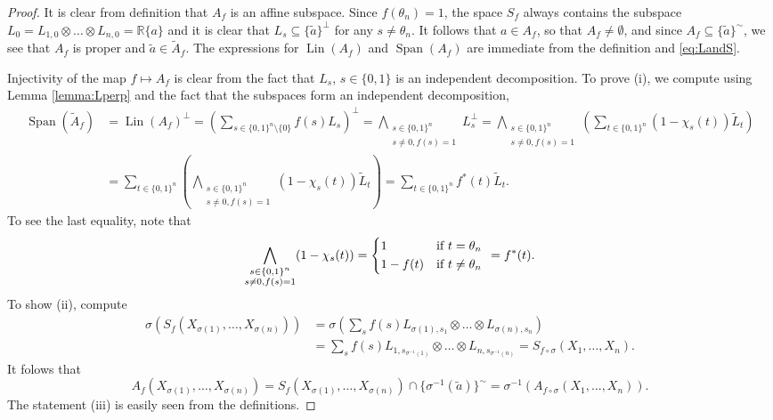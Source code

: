 \documentclass[12pt]{article}
\theoremstyle{definition}
\theoremstyle{remark}
\def\lin{\operatorname{Lin}}
\def\Span{\operatorname{Span}}
\begin{document}
\begin{proof} It is clear from definition that $A_f$ is an affine subspace. Since
$f(\theta_n)=1$, the space $S_f$ always contains the subspace $L_0=L_{1,0}\otimes\dots\otimes
L_{n,0}=\mathbb R\{a\}$ and it is clear that $L_s\subseteq \{\tilde a\}^\perp$ for any
$s\ne \theta_n$. It follows that $a\in A_f$, so that $A_f\ne \emptyset$, and since $A_f\subseteq
\{\tilde a\}^\sim$, we see that  $A_f$ is proper and $\tilde
a\in \tilde A_f$.  The expressions for $\lin(A_f)$ and $\Span(A_f)$ are immediate from the definition and
\eqref{eq:LandS}. 

Injectivity of the map $f\mapsto A_f$ is clear from the fact that $L_s$, $s\in \{0,1\}$ is
an independent decomposition. To prove (i), we compute
using Lemma \ref{lemma:Lperp} and the fact that the subspaces form an independent
decomposition,
\begin{align*}
\Span(\tilde A_f)&=\lin(A_f)^\perp=\left(\sum_{s\in\{0,1\}^n\setminus\{0\}}
f(s)L_s\right)^\perp=
\bigwedge_{\substack{s\in\{0,1\}^n\\ s\ne 0, f(s)=1}}L_s^\perp=
\bigwedge_{\substack{s\in\{0,1\}^n\\ s\ne 0,
f(s)=1}}\left(\sum_{t\in\{0,1\}^n}(1-{\chi}_s(t))\tilde L_t\right)\\
&=\sum_{t\in\{0,1\}^n} \left(\bigwedge_{\substack{s\in \{0,1\}^n\\ s\ne 0, f(s)=1}}
(1-{\chi}_s(t))\tilde L_t\right)=\sum_{t\in \{0,1\}^n} f^*(t) \tilde L_t.
\end{align*}
To see the last equality, note that
\[
\bigwedge_{\substack{s\in \{0,1\}^n\\ s\ne 0, f(s)=1}}
(1-{\chi}_s(t))=\begin{dcases} 1 & \text{if } t=\theta_n\\ 1-f(t) & \text{if } t\ne \theta_n
\end{dcases} \ = f^*(t).
\]
To show (ii), compute
\begin{align*}
\sigma(S_f(X_{\sigma(1)},\dots,X_{\sigma(n)}))&=\sigma(\sum_{s} f(s)L_{\sigma(1),s_1}\otimes\dots \otimes
L_{\sigma(n),s_n})\\
&=\sum_s f(s) L_{1,s_{\sigma^{-1}(1)}}\otimes\dots\otimes
L_{n,s_{\sigma^{-1}(n)}}=S_{f\circ\sigma}(X_1,\dots,X_n).
\end{align*}
It folows that
\[
A_f(X_{\sigma(1)},\dots, X_{\sigma(n)})=S_f(X_{\sigma(1)},\dots, X_{\sigma(n)})\cap
\{\sigma^{-1}(\tilde a)\}^\sim=
\sigma^{-1}(A_{f\circ\sigma}(X_1,\dots,X_n)).
\]
The statement (iii) is easily seen from the definitions.
\end{proof}
\end{document}
